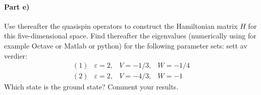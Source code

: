\documentclass[prc]{revtex4}
\begin{document}
\paragraph{Part e)}
Use thereafter the quasispin operators to construct the Hamiltonian matrix 
$H$ for this five-dimensional space.  Find thereafter the eigenvalues
(numerically using for example Octave or Matlab or python)  for the following parameter sets:
sett av verdier:
\[
\begin{array}{cccc}
(1)&\varepsilon=2,&V=-1/3,&W=-1/4\\
(2)&\varepsilon=2,&V=-4/3,&W=-1
\end{array}
\]
Which state is the ground state? Comment your results.
\end{document}
